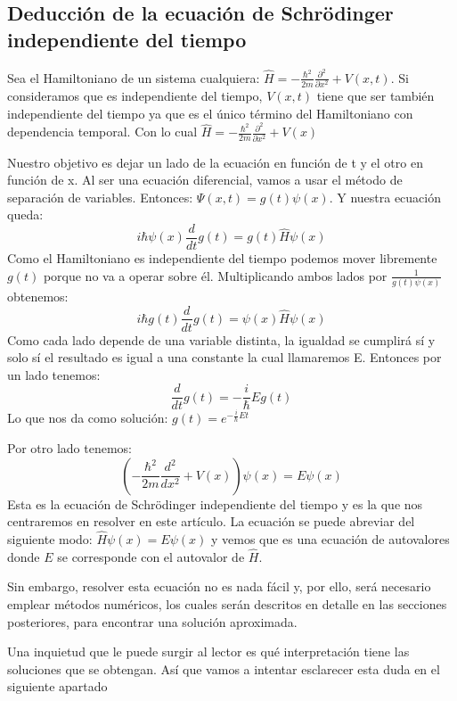 \documentclass{article}
\begin{document}
		\subsection{Deducción de la ecuación de Schrödinger independiente del tiempo}
	Sea el Hamiltoniano de un sistema cualquiera: 
	$\hat{H}=-\frac{\hbar^{2}}{2m}\frac{\partial^{2}}{\partial x^{2}}+V(x,t)$.
	Si consideramos que es independiente del tiempo, $V(x,t)$ tiene que ser también 
	independiente del tiempo ya que es el único término del Hamiltoniano
	con dependencia temporal. Con lo cual $\hat{H}=-\frac{\hbar^{2}}{2m}\frac{\partial^{2}}{\partial x^{2}}+V(x)$ \\
	\par
	Nuestro objetivo es dejar un lado de la ecuación en función de t y el otro en función de x. Al ser una ecuación diferencial, vamos a usar el método de separación de variables. Entonces: $\Psi (x,t)= g(t) \psi(x)$. 
	Y nuestra ecuación queda:
	\begin{equation}
		i\hbar \psi (x) \frac{d}{d t}g(t)= g(t) \hat{H} \psi (x)
	\end{equation}
	Como el Hamiltoniano es independiente del tiempo podemos mover libremente 
	$g(t)$ porque no va a operar sobre él. Multiplicando ambos 
	lados por $\frac{1}{g(t)\psi(x)}$ obtenemos:
	\begin{equation}
		i\hbar g(t) \frac{d}{d t}g(t)= \psi(x) \hat{H} \psi (x)
	\end{equation}
	Como cada lado depende de una variable distinta, la igualdad
	se cumplirá sí y solo sí el resultado es igual a una constante la cual 
	llamaremos E. Entonces por un lado tenemos:
	\begin{equation}
		\frac{d}{d t}g(t)=-\frac{i}{\hbar} Eg(t)
	\end{equation}
	Lo que nos da como solución: $g(t)= e^{-\frac{i}{\hbar}Et}$ \\
	\par
	Por otro lado tenemos:
	\begin{equation}
		\left(-\frac{\hbar^{2}}{2m}\frac{d^{2}}{d x^{2}}+V(x)\right) \psi(x)=E \psi(x)
	\end{equation}
	Esta es la ecuación de Schrödinger independiente del tiempo 
	y es la que nos centraremos en resolver en este artículo. 
	La ecuación se puede abreviar del siguiente modo: $\hat{H} \psi (x)=E \psi (x)$ y vemos
	que es una ecuación de autovalores donde $E$ se corresponde con el autovalor
	de $\hat{H}$. \\
	\par
	Sin embargo, resolver esta ecuación no es nada fácil y, 
	por ello, será necesario emplear métodos numéricos, 
	los cuales serán descritos en detalle 
	en las secciones posteriores, para encontrar una solución aproximada. \\
	\par 
	Una inquietud que le puede surgir al lector es qué interpretación
	tiene las soluciones que se obtengan. Así que vamos a intentar esclarecer
	esta duda en el siguiente apartado
\end{document}
